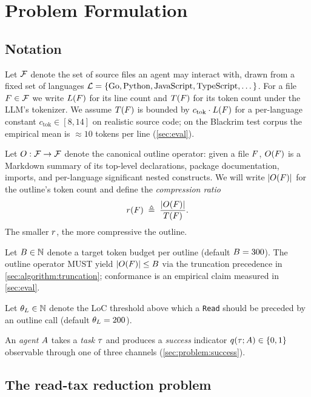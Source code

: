 \section{Problem Formulation}
\label{sec:problem}

\subsection{Notation}

Let $\mathcal{F}$ denote the set of source files an agent may interact
with, drawn from a fixed set of languages $\mathcal{L} = \{\text{Go},
\text{Python}, \text{JavaScript}, \text{TypeScript}, \dots\}$. For a
file $F \in \mathcal{F}$ we write $L(F)$ for its line count
and $T(F)$ for its token count under the LLM's tokenizer.
We assume $T(F)$ is bounded by $c_\text{tok} \cdot L(F)$
for a per-language constant $c_\text{tok} \in [8, 14]$ on realistic
source code; on the Blackrim test corpus the empirical mean is
$\approx 10$ tokens per line (\cref{sec:eval}).

Let $O : \mathcal{F} \to \mathcal{F}$ denote the canonical outline
operator: given a file $F$, $O(F)$ is a Markdown
summary of its top-level declarations, package documentation, imports,
and per-language significant nested constructs. We will write
$|O(F)|$ for the outline's token count and define the
\emph{compression ratio}
\[
  r(F) \;\triangleq\; \frac{|O(F)|}{T(F)}.
\]
The smaller $r$, the more compressive the outline.

Let $B \in \mathbb{N}$ denote a target token budget per outline
(default $B = 300$). The outline operator MUST yield
$|O(F)| \leq B$ via the truncation precedence in
\cref{sec:algorithm:truncation}; conformance is an empirical claim
measured in \cref{sec:eval}.

Let $\theta_{L} \in \mathbb{N}$ denote the LoC threshold above which a
\texttt{Read} should be preceded by an outline call (default
$\theta_{L} = 200$).

An \emph{agent} $A$ takes a \emph{task} $\tau$ and produces a
\emph{success} indicator $q(\tau; A) \in \{0, 1\}$
observable through one of three channels (\cref{sec:problem:success}).

\subsection{The read-tax reduction problem}

